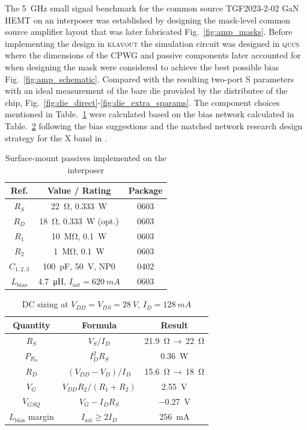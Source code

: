 \documentclass[conference]{IEEEtran}
\begin{document}
The \SI{5}{\giga\hertz} small signal benchmark for the common source TGF2023-2-02 GaN HEMT on an interposer was established by designing the mask-level common source amplifier layout that was later fabricated Fig.~\ref{fig:amp_masks}. Before implementing the design in \textsc{klayout} the simulation circuit was designed in \textsc{qucs} where the dimensions of the CPWG and passive components later accounted for when designing the mask were considered to achieve the best possible bias Fig.~\ref{fig:amp_schematic}. Compared with the resulting two-port S parameters with an ideal measurement of the bare die provided by the distributee of the chip, Fig.~\ref{fig:die_direct}-\ref{fig:die_extra_sparams}. The component choices mentioned in Table.~\ref{tab:passives} were calculated based on the bias network calculated in Table.~\ref{tab:calc} following the bias suggestions and the matched network research design strategy for the X band in \cite{Basseri2018}.

\begin{table}[htbp]
\caption{Surface-mount passives implemented on the interposer}
\label{tab:passives}
\begin{center}
\begin{tabular}{|c|c|c|}
\hline
\textbf{Ref.} & \textbf{Value / Rating} & \textbf{Package} \\
\hline
$R_S$ & \SI{22}{\ohm}, \SI{0.333}{W} & 0603 \\
$R_D$ & \SI{18}{\ohm}, \SI{0.333}{W} (opt.) & 0603 \\
$R_1$ & \SI{10}{\mega\ohm}, \SI{0.1}{W} & 0603 \\
$R_2$ & \SI{1}{\mega\ohm}, \SI{0.1}{W} & 0603 \\
$C_{1,2,3}$ & \SI{100}{\pico\farad}, \SI{50}{V}, NP0 & 0402 \\
$L_{\text{bias}}$ & \SI{4.7}{\micro\henry}, $I_\text{sat}=\SI{620}{mA}$ & 0603 \\
\hline
\end{tabular}
\end{center}
\end{table}

\begin{table}[htbp]
\caption{DC sizing at $V_{DD}=V_{DS}=\SI{28}{V}$, $I_{D}=\SI{128}{mA}$}
\label{tab:calc}
\begin{center}
\begin{tabular}{|c|c|c|}
\hline
\textbf{Quantity} & \textbf{Formula} & \textbf{Result} \\
\hline
$R_S$ & $V_S/I_D$ & \SI{21.9}{\ohm}\,$\rightarrow$\,\SI{22}{\ohm} \\
$P_{R_S}$ & $I_D^{2}R_S$ & \SI{0.36}{W} \\
$R_D$ & $(V_{DD}-V_D)/I_D$ & \SI{15.6}{\ohm}\,$\rightarrow$\,\SI{18}{\ohm} \\
$V_G$ & $V_{DD}R_2/(R_1+R_2)$ & \SI{2.55}{V} \\
$V_{GSQ}$ & $V_G-I_D R_S$ & \SI{-0.27}{V} \\
$L_{\text{bias}}$ margin & $I_{\text{sat}}\ge 2I_D$ & \SI{256}{mA} \\
\hline
\end{tabular}
\end{center}
\end{table}
\end{document}
